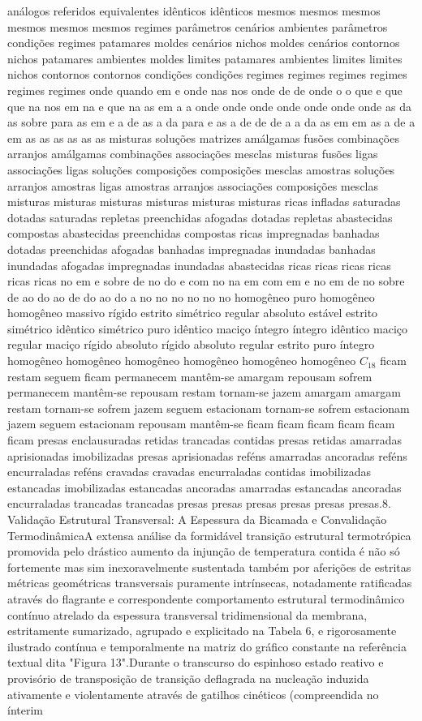 análogos referidos equivalentes idênticos idênticos mesmos mesmos mesmos mesmos mesmos mesmos regimes parâmetros cenários ambientes parâmetros condições regimes patamares moldes cenários nichos moldes cenários contornos nichos patamares ambientes moldes limites patamares ambientes limites limites nichos contornos contornos condições condições regimes regimes regimes regimes regimes regimes onde quando em e onde nas nos onde de de onde o o que e que que na nos em na e que na as em a a onde onde onde onde onde onde onde as da as sobre para as em e a de as a da para e as a de de de a a da as em em as a de a em as as as as as as misturas soluções matrizes amálgamas fusões combinações arranjos amálgamas combinações associações mesclas misturas fusões ligas associações ligas soluções composições composições mesclas amostras soluções arranjos amostras ligas amostras arranjos associações composições mesclas misturas misturas misturas misturas misturas misturas ricas infladas saturadas dotadas saturadas repletas preenchidas afogadas dotadas repletas abastecidas compostas abastecidas preenchidas compostas ricas impregnadas banhadas dotadas preenchidas afogadas banhadas impregnadas inundadas banhadas inundadas afogadas impregnadas inundadas abastecidas ricas ricas ricas ricas ricas ricas no em e sobre de no do e com no na em com em e no em de no sobre de ao do ao de do ao do a no no no no no no homogêneo puro homogêneo homogêneo massivo rígido estrito simétrico regular absoluto estável estrito simétrico idêntico simétrico puro idêntico maciço íntegro íntegro idêntico maciço regular maciço rígido absoluto rígido absoluto regular estrito puro íntegro homogêneo homogêneo homogêneo homogêneo homogêneo homogêneo $C_{18}$ ficam restam seguem ficam permanecem mantêm-se amargam repousam sofrem permanecem mantêm-se repousam restam tornam-se jazem amargam amargam restam tornam-se sofrem jazem seguem estacionam tornam-se sofrem estacionam jazem seguem estacionam repousam mantêm-se ficam ficam ficam ficam ficam ficam presas enclausuradas retidas trancadas contidas presas retidas amarradas aprisionadas imobilizadas presas aprisionadas reféns amarradas ancoradas reféns encurraladas reféns cravadas cravadas encurraladas contidas imobilizadas estancadas imobilizadas estancadas ancoradas amarradas estancadas ancoradas encurraladas trancadas trancadas presas presas presas presas presas presas.8. Validação Estrutural Transversal: A Espessura da Bicamada e Convalidação TermodinâmicaA extensa análise da formidável transição estrutural termotrópica promovida pelo drástico aumento da injunção de temperatura contida é não só fortemente mas sim inexoravelmente sustentada também por aferições de estritas métricas geométricas transversais puramente intrínsecas, notadamente ratificadas através do flagrante e correspondente comportamento estrutural termodinâmico contínuo atrelado da espessura transversal tridimensional da membrana, estritamente sumarizado, agrupado e explicitado na Tabela 6, e rigorosamente ilustrado contínua e temporalmente na matriz do gráfico constante na referência textual dita "Figura 13".Durante o transcurso do espinhoso estado reativo e provisório de transposição de transição deflagrada na nucleação induzida ativamente e violentamente através de gatilhos cinéticos (compreendida no ínterim 